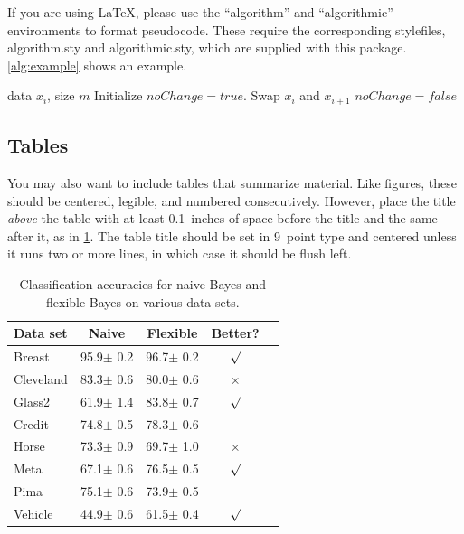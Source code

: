 \documentclass{article}
\theoremstyle{plain}
\theoremstyle{definition}
\theoremstyle{remark}
\begin{document}
If you are using \LaTeX, please use the ``algorithm'' and ``algorithmic''
environments to format pseudocode. These require
the corresponding stylefiles, algorithm.sty and
algorithmic.sty, which are supplied with this package.
\cref{alg:example} shows an example.

\begin{algorithm}[tb]
   \caption{Bubble Sort}
   \label{alg:example}
\begin{algorithmic}
    data $x_i$, size $m$
   \REPEAT
   \STATE Initialize $noChange = true$.
   \STATE Swap $x_i$ and $x_{i+1}$
   \STATE $noChange = false$
   \ENDIF
   \ENDFOR
\end{algorithmic}
\end{algorithm}

\subsection{Tables}

You may also want to include tables that summarize material. Like
figures, these should be centered, legible, and numbered consecutively.
However, place the title \emph{above} the table with at least
0.1~inches of space before the title and the same after it, as in
\cref{sample-table}. The table title should be set in 9~point
type and centered unless it runs two or more lines, in which case it
should be flush left.


\begin{table}[t]
\caption{Classification accuracies for naive Bayes and flexible
Bayes on various data sets.}
\label{sample-table}
\vskip 0.15in
\begin{center}
\begin{small}
\begin{sc}
\begin{tabular}{lcccr}
\toprule
Data set & Naive & Flexible & Better? \\
\midrule
Breast    & 95.9$\pm$ 0.2& 96.7$\pm$ 0.2& $\surd$ \\
Cleveland & 83.3$\pm$ 0.6& 80.0$\pm$ 0.6& $\times$\\
Glass2    & 61.9$\pm$ 1.4& 83.8$\pm$ 0.7& $\surd$ \\
Credit    & 74.8$\pm$ 0.5& 78.3$\pm$ 0.6&         \\
Horse     & 73.3$\pm$ 0.9& 69.7$\pm$ 1.0& $\times$\\
Meta      & 67.1$\pm$ 0.6& 76.5$\pm$ 0.5& $\surd$ \\
Pima      & 75.1$\pm$ 0.6& 73.9$\pm$ 0.5&         \\
Vehicle   & 44.9$\pm$ 0.6& 61.5$\pm$ 0.4& $\surd$ \\
\bottomrule
\end{tabular}
\end{sc}
\end{small}
\end{center}
\vskip -0.1in
\end{table}
\end{document}
